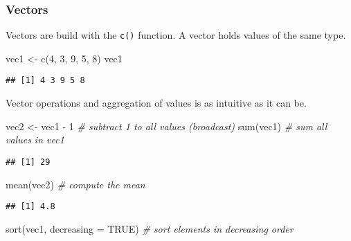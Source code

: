 \documentclass[
  oneside]{book}
\newenvironment{Shaded}{\begin{snugshade}}{\end{snugshade}}
\newcommand{\AttributeTok}[1]{\textcolor[rgb]{0.77,0.63,0.00}{#1}}
\newcommand{\CommentTok}[1]{\textcolor[rgb]{0.56,0.35,0.01}{\textit{#1}}}
\newcommand{\ConstantTok}[1]{\textcolor[rgb]{0.00,0.00,0.00}{#1}}
\newcommand{\DecValTok}[1]{\textcolor[rgb]{0.00,0.00,0.81}{#1}}
\newcommand{\FunctionTok}[1]{\textcolor[rgb]{0.00,0.00,0.00}{#1}}
\newcommand{\NormalTok}[1]{#1}
\newcommand{\OtherTok}[1]{\textcolor[rgb]{0.56,0.35,0.01}{#1}}
\newcommand{\SpecialCharTok}[1]{\textcolor[rgb]{0.00,0.00,0.00}{#1}}
\begin{document}
\hypertarget{vectors}{%
\subsubsection{Vectors}\label{vectors}}

Vectors are build with the \texttt{c()} function.
A vector holds values of the same type.

\begin{Shaded}
\begin{Highlighting}[]
\NormalTok{vec1 }\OtherTok{\textless{}{-}} \FunctionTok{c}\NormalTok{(}\DecValTok{4}\NormalTok{, }\DecValTok{3}\NormalTok{, }\DecValTok{9}\NormalTok{, }\DecValTok{5}\NormalTok{, }\DecValTok{8}\NormalTok{)}
\NormalTok{vec1}
\end{Highlighting}
\end{Shaded}

\begin{verbatim}
## [1] 4 3 9 5 8
\end{verbatim}

Vector operations and aggregation of values is as intuitive as it can be.

\begin{Shaded}
\begin{Highlighting}[]
\NormalTok{vec2 }\OtherTok{\textless{}{-}}\NormalTok{ vec1 }\SpecialCharTok{{-}} \DecValTok{1} \CommentTok{\# subtract 1 to all values (broadcast)}
\FunctionTok{sum}\NormalTok{(vec1) }\CommentTok{\# sum all values in vec1}
\end{Highlighting}
\end{Shaded}

\begin{verbatim}
## [1] 29
\end{verbatim}

\begin{Shaded}
\begin{Highlighting}[]
\FunctionTok{mean}\NormalTok{(vec2) }\CommentTok{\# compute the mean}
\end{Highlighting}
\end{Shaded}

\begin{verbatim}
## [1] 4.8
\end{verbatim}

\begin{Shaded}
\begin{Highlighting}[]
\FunctionTok{sort}\NormalTok{(vec1, }\AttributeTok{decreasing =} \ConstantTok{TRUE}\NormalTok{) }\CommentTok{\# sort elements in decreasing order}
\end{Highlighting}
\end{Shaded}
\end{document}
